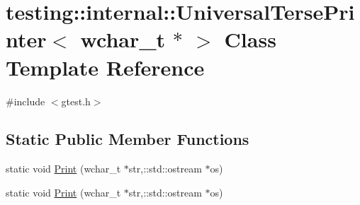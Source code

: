 \hypertarget{classtesting_1_1internal_1_1_universal_terse_printer_3_01wchar__t_01_5_01_4}{\section{testing\-:\-:internal\-:\-:Universal\-Terse\-Printer$<$ wchar\-\_\-t $\ast$ $>$ Class Template Reference}
\label{classtesting_1_1internal_1_1_universal_terse_printer_3_01wchar__t_01_5_01_4}
}


{\ttfamily \#include $<$gtest.\-h$>$}

\subsection*{Static Public Member Functions}
\begin{DoxyCompactItemize}
\item 
static void \hyperlink{classtesting_1_1internal_1_1_universal_terse_printer_3_01wchar__t_01_5_01_4_af6009c8891ea3bdc190eddf76228305a}{Print} (wchar\-\_\-t $\ast$str,\-::std\-::ostream $\ast$os)
\item 
static void \hyperlink{classtesting_1_1internal_1_1_universal_terse_printer_3_01wchar__t_01_5_01_4_af6009c8891ea3bdc190eddf76228305a}{Print} (wchar\-\_\-t $\ast$str,\-::std\-::ostream $\ast$os)
\end{DoxyCompactItemize}


